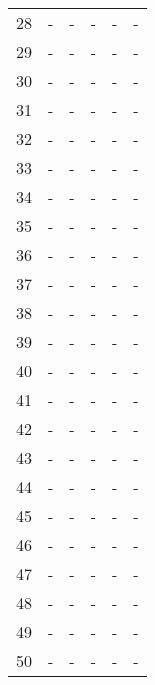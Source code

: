 \begin{table}
\begin{tabular}{llllll}
28 &   - &    - &    - &     - &        - \\
29 &   - &    - &    - &     - &        - \\
30 &   - &    - &    - &     - &        - \\
31 &   - &    - &    - &     - &        - \\
32 &   - &    - &    - &     - &        - \\
33 &   - &    - &    - &     - &        - \\
34 &   - &    - &    - &     - &        - \\
35 &   - &    - &    - &     - &        - \\
36 &   - &    - &    - &     - &        - \\
37 &   - &    - &    - &     - &        - \\
38 &   - &    - &    - &     - &        - \\
39 &   - &    - &    - &     - &        - \\
40 &   - &    - &    - &     - &        - \\
41 &   - &    - &    - &     - &        - \\
42 &   - &    - &    - &     - &        - \\
43 &   - &    - &    - &     - &        - \\
44 &   - &    - &    - &     - &        - \\
45 &   - &    - &    - &     - &        - \\
46 &   - &    - &    - &     - &        - \\
47 &   - &    - &    - &     - &        - \\
48 &   - &    - &    - &     - &        - \\
49 &   - &    - &    - &     - &        - \\
50 &   - &    - &    - &     - &        - \\
\bottomrule
\end{tabular}
\end{table}
